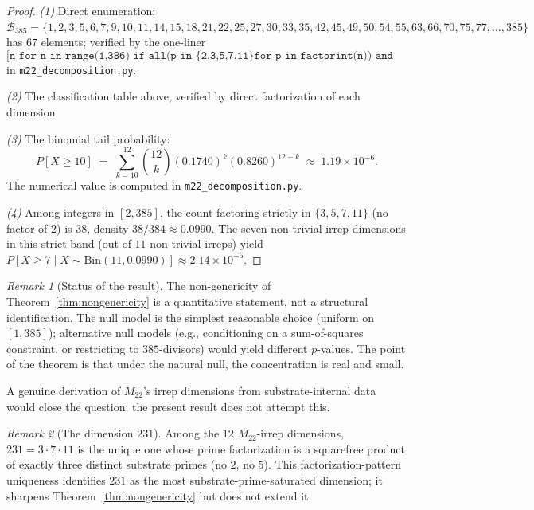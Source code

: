 \documentclass[11pt,reqno]{amsart}
\theoremstyle{plain}
\theoremstyle{definition}
\theoremstyle{remark}
\newtheorem*{remark}{Remark}
\newcommand{\Mtwentytwo}{M_{22}}
\begin{document}
\begin{proof}
\textit{(1)} Direct enumeration:
$\mathcal{B}_{385} = \{1, 2, 3, 5, 6, 7, 9, 10, 11, 14, 15, 18, 21,
22, 25, 27, 30, 33, 35, 42, 45, 49, 50, 54, 55, 63, 66, 70, 75, 77,
\ldots, 385\}$ has $67$ elements; verified by the one-liner
\[
  \texttt{[n for n in range(1,386) if all(p in \{2,3,5,7,11\}
  for p in factorint(n)) and factorint(n).get(2,0) <= 1]}
\]
in \texttt{m22\_decomposition.py}.

\textit{(2)} The classification table above; verified by direct
factorization of each dimension.

\textit{(3)} The binomial tail probability:
\[
  P[X \ge 10] \;=\; \sum_{k=10}^{12} \binom{12}{k}
  (0.1740)^{k} (0.8260)^{12-k}
  \;\approx\; 1.19 \times 10^{-6}.
\]
The numerical value is computed in \texttt{m22\_decomposition.py}.

\textit{(4)} Among integers in $[2, 385]$, the count factoring strictly
in $\{3, 5, 7, 11\}$ (no factor of $2$) is $38$, density $38 / 384
\approx 0.0990$. The seven non-trivial irrep dimensions in this strict
band (out of $11$ non-trivial irreps) yield
$P[X \ge 7 \mid X \sim \mathrm{Bin}(11, 0.0990)] \approx 2.14 \times
10^{-5}$.
\end{proof}

\begin{remark}[Status of the result]
The non-genericity of Theorem~\ref{thm:nongenericity} is a
quantitative statement, not a structural identification. The null
model is the simplest reasonable choice (uniform on $[1, 385]$);
alternative null models (e.g., conditioning on a sum-of-squares
constraint, or restricting to $385$-divisors) would yield different
$p$-values. The point of the theorem is that under the natural
null, the concentration is real and small.

A genuine derivation of $\Mtwentytwo$'s irrep dimensions from
substrate-internal data would close the question; the present
result does not attempt this.
\end{remark}

\begin{remark}[The dimension $231$]
Among the $12$ $\Mtwentytwo$-irrep dimensions, $231 = 3 \cdot 7
\cdot 11$ is the unique one whose prime factorization is a
squarefree product of exactly three distinct substrate primes
(no $2$, no $5$). This factorization-pattern uniqueness identifies
$231$ as the most substrate-prime-saturated dimension; it sharpens
Theorem~\ref{thm:nongenericity} but does not extend it.
\end{remark}
\end{document}
